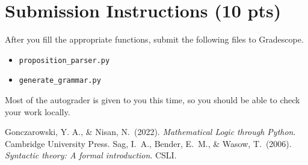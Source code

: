 \documentclass{article}
\begin{document}

    
\section*{Submission Instructions (10 pts)}
    After you fill the appropriate functions, submit the following files to Gradescope.
    \begin{itemize}
        \item \lstinline{proposition_parser.py}
        \item \lstinline{generate_grammar.py}
    \end{itemize}
    Most of the autograder is given to you this time, so you should be able to check your work locally.

\begin{thebibliography}{9}
    Gonczarowski, Y. A., \& Nisan, N.\ (2022). \textit{Mathematical Logic through Python}. Cambridge University Press.
    Sag, I.\ A., Bender, E.\ M., \& Wasow, T.\ (2006). \textit{Syntactic theory: A formal introduction}. CSLI. 
\end{thebibliography}
\end{document}
